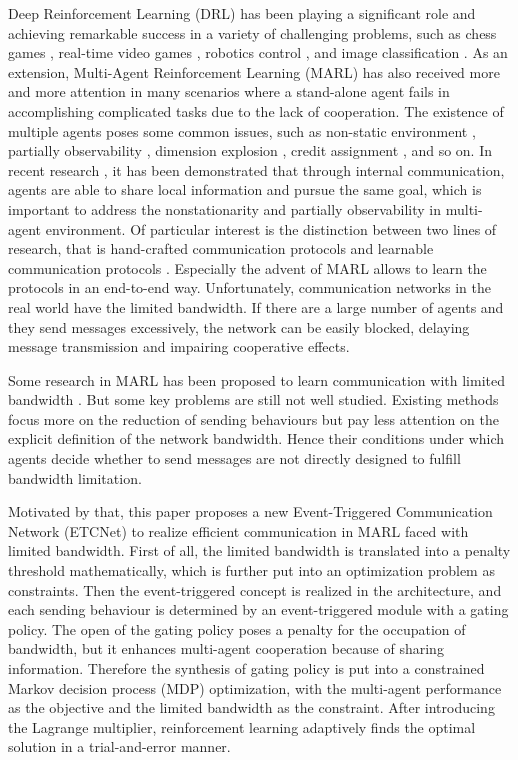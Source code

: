 \documentclass[letterpaper]{article} %
\begin{document}
Deep Reinforcement Learning (DRL) has been playing a significant role and achieving remarkable success in a variety of challenging problems, such as chess games \cite{alphagozero}, real-time video games \cite{alphastar, shao2018starcraft}, robotics control \cite{levine2016end}, and image classification \cite{zhao2016vehicle}. As an extension, Multi-Agent Reinforcement Learning (MARL) has also received more and more attention in many scenarios where a stand-alone agent fails in accomplishing complicated tasks due to the lack of cooperation. The existence of multiple agents poses some common issues, such as non-static environment \cite{hernandez2017survey}, partially observability \cite{maddpg, vdn}, dimension explosion \cite{fql}, credit assignment \cite{coma, qmix}, and so on. In recent research \cite{szer2004improving}, it has been demonstrated that through internal communication, agents are able to share local information and pursue the same goal, which is important to address the nonstationarity and partially observability in multi-agent environment. Of particular interest is the distinction between two lines of research, that is hand-crafted communication protocols \cite{zhang2013coordinating} and learnable communication protocols \cite{dial, commnet}. Especially the advent of MARL allows to learn the protocols in an end-to-end way. Unfortunately, communication networks in the real world have the limited bandwidth. If there are a large number of agents and they send messages excessively, the network can be easily blocked, delaying message transmission and impairing cooperative effects.

Some research in MARL has been proposed to learn communication with limited bandwidth  \cite{atoc, schednet, pruning, imac}. But some key problems are still not well studied. Existing methods focus more on the reduction of sending behaviours but pay less attention on the explicit definition of the network bandwidth. Hence their conditions under which agents decide whether to send messages are not directly designed to fulfill bandwidth limitation.



Motivated by that, this paper proposes a new Event-Triggered Communication Network (ETCNet) to realize efficient communication in MARL faced with limited bandwidth. First of all, the limited bandwidth is translated into a penalty threshold mathematically, which is further put into an optimization problem as constraints. Then the event-triggered concept is realized in the architecture, and each sending behaviour is determined by an event-triggered module with a gating policy. The open of the gating policy poses a penalty for the occupation of bandwidth, but it enhances multi-agent cooperation because of sharing information. Therefore the synthesis of gating policy is put into a constrained Markov decision process (MDP) optimization, with the multi-agent performance as the objective and the limited bandwidth as the constraint. After introducing the Lagrange multiplier, reinforcement learning adaptively finds the optimal solution in a trial-and-error manner.
\end{document}
